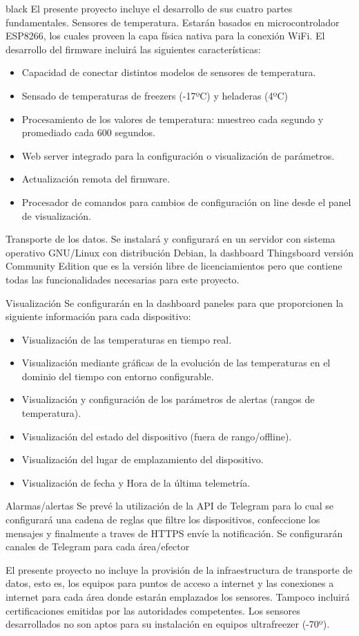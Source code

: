 \documentclass[11pt]{charter}
\begin{document}
\begin{consigna}{black}
El presente proyecto incluye el desarrollo de sus cuatro partes fundamentales.
Sensores de temperatura.
Estarán basados en microcontrolador ESP8266, los cuales proveen la capa física nativa para la conexión WiFi. El desarrollo del firmware incluirá las siguientes características:
\begin{itemize}
\item Capacidad de conectar distintos modelos de sensores de temperatura.
\item Sensado de temperaturas de freezers (-17ºC) y heladeras (4ºC)
\item Procesamiento de los valores de temperatura: muestreo cada segundo y promediado cada 600 segundos.
\item Web server integrado para la configuración o visualización de parámetros.
\item Actualización remota del firmware.
\item Procesador de comandos para cambios de configuración on line desde el panel de visualización.
\end{itemize}
Transporte de los datos.
Se instalará y configurará en un servidor con sistema operativo GNU/Linux con distribución Debian, la dashboard Thingsboard versión Community Edition que es la versión libre de licenciamientos pero que contiene todas las funcionalidades necesarias para este proyecto.

Visualización
Se configurarán en la dashboard paneles para que proporcionen la siguiente información para cada dispositivo:
\begin{itemize}
\item Visualización de las temperaturas en tiempo real.
\item Visualización mediante gráficas de la evolución de las temperaturas en el dominio del tiempo con entorno configurable.
\item Visualización y configuración de los parámetros de alertas (rangos de temperatura).
\item Visualización del estado del dispositivo (fuera de rango/offline).
\item Visualización del lugar de emplazamiento del dispositivo.
\item Visualización de fecha y Hora de  la última telemetría.
\end{itemize}

Alarmas/alertas
Se prevé la utilización de la API de Telegram para lo cual se configurará una cadena de reglas que filtre los dispositivos, confeccione los mensajes y finalmente a traves de HTTPS envíe la notificación.
Se configurarán canales de Telegram para cada área/efector

El presente proyecto no incluye la provisión de la infraestructura de transporte de datos, esto es, los equipos para puntos de acceso a internet y las conexiones a internet para cada área donde estarán emplazados los sensores. Tampoco incluirá certificaciones emitidas por las autoridades competentes.
Los sensores desarrollados no son aptos para su instalación en equipos ultrafreezer (-70º).

\end{consigna}
\end{document}
